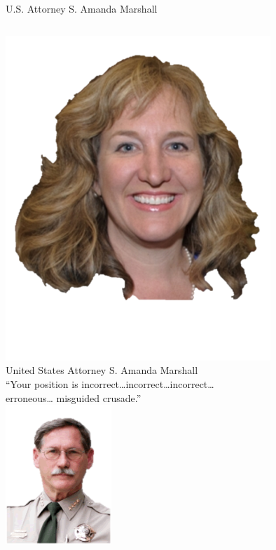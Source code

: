 \documentclass{beamer}
\begin{document}
\begin{frame}{U.S. Attorney S. Amanda Marshall}
    \begin{columns}[onlytextwidth]
            \centering
            \includegraphics[width=0.75\textwidth]{img/amanda-marshall.png} \\
            United States Attorney S. Amanda Marshall \\

            \centering
            ``Your position is incorrect\ldots incorrect\ldots incorrect\ldots \\ erroneous\ldots {} misguided crusade.'' \\
            \includegraphics[width=0.3\textwidth]{img/gil-gilbertson.png} \\
    \end{columns}
\end{frame}
\end{document}
